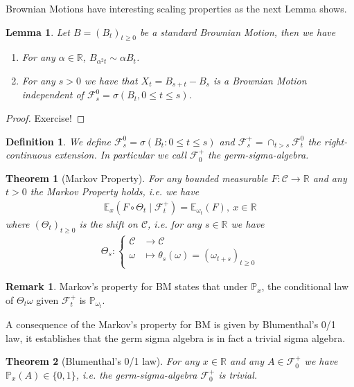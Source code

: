 \documentclass[11pt,a4paper, final]{article}
\newtheorem{lem}{Lemma}[section]
\newtheorem{thm}{Theorem}[section]
\newtheorem{defn}{Definition}[section]
\theoremstyle{definition}
\newtheorem{rem}{Remark}[section]
\begin{document}
\noindent Brownian Motions have interesting scaling properties as the next Lemma shows.
\begin{lem} Let $B=(B_t)_{t \geq 0}$ be a standard Brownian Motion, then we have 
\begin{enumerate}
\item For any $\alpha \in \mathbb{R}$, $B_{ \alpha^2 t} \sim \alpha B_t$.
\item For any $s >0$ we have that $X_t = B_{s+t}-B_s$ is a Brownian Motion independent of $\mathcal{F}_s^0 = \sigma ( B_t, 0 \leq t \leq s )$. 
\end{enumerate} 
\end{lem}
\begin{proof}
Exercise!
\end{proof}
\begin{defn} We define $\mathcal{F}_s^0 = \sigma ( B_t : 0 \leq t \leq s)$ and $\mathcal{F}_s^+ = \cap_{t >s} \mathcal{F}_t^0$ the right-continuous extension. In particular we call $\mathcal{F}_0^+$ the germ-sigma-algebra. 
\end{defn}
\begin{thm}[Markov Property] For any bounded measurable $F: \mathcal{C} \to \mathbb{R}$ and any $t >0$ the Markov Property holds, i.e. we have
\begin{align*}
\mathbb{E}_x ( F \circ \Theta_t \mid \mathcal{F}_t^+ ) = \mathbb{E}_{ \omega_t} (F), \ x \in \mathbb{R}
\end{align*}
where $(\Theta_t)_{t \geq 0}$ is the shift on $\mathcal{C}$, i.e. for any $s \in \mathbb{R}$ we have 
\begin{align*}
\Theta_s : \begin{cases} \mathcal{C} & \longrightarrow \mathcal{C} \\
\omega & \longmapsto \theta_s( \omega) = (\omega_{t+s})_{t \geq 0}
\end{cases}
\end{align*}
\end{thm}
\begin{rem} Markov's property for BM states that under $\mathbb{P}_x$, the conditional law of $\Theta_t \omega$ given $\mathcal{F}_t^+$ is $\mathbb{P}_{ \omega_t}$.
\end{rem}
\noindent A consequence of the Markov's property for BM is given by Blumenthal's 0/1 law, it establishes that the germ sigma algebra is in fact a trivial sigma algebra.
\begin{thm}[Blumenthal's 0/1 law] For any $x \in \mathbb{R}$ and any $A \in \mathcal{F}_0^+$ we have $\mathbb{P}_x(A) \in \lbrace 0,1 \rbrace$, i.e. the germ-sigma-algebra $\mathcal{F}_0^+$ is trivial. 
\end{thm}
\end{document}
